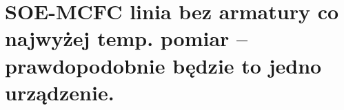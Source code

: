 \section{SOE-MCFC linia bez armatury co najwyżej temp. pomiar – prawdopodobnie
będzie to jedno urządzenie.}